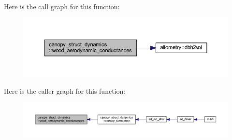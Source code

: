 Here is the call graph for this function\+:\nopagebreak
\begin{figure}[H]
\begin{center}
\leavevmode
\includegraphics[width=350pt]{namespacecanopy__struct__dynamics_a6cab5b6e950a0bf9da7ef1bee0b5c4ad_cgraph}
\end{center}
\end{figure}




Here is the caller graph for this function\+:\nopagebreak
\begin{figure}[H]
\begin{center}
\leavevmode
\includegraphics[width=350pt]{namespacecanopy__struct__dynamics_a6cab5b6e950a0bf9da7ef1bee0b5c4ad_icgraph}
\end{center}
\end{figure}



